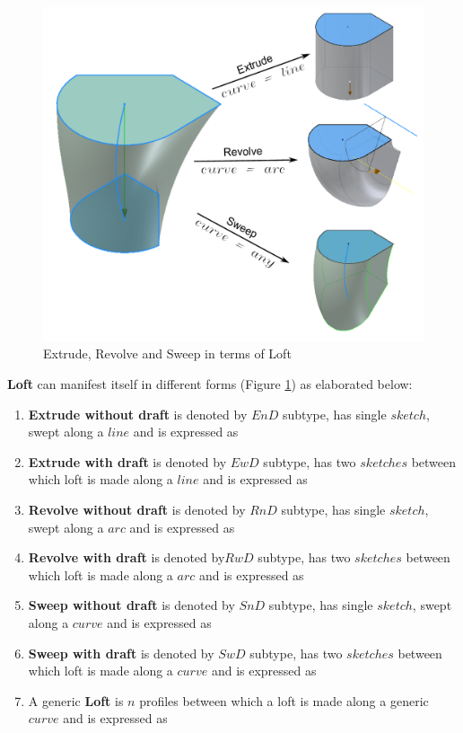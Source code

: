 \begin{figure}[htbp]
	\includegraphics[scale=0.35]{../Common/images//LoftExtrudeRevSwp.pdf} 
\caption{Extrude, Revolve and Sweep in terms of Loft}
\label{figure_extrevswp}
\end{figure}

{\bf Loft} can manifest itself in different forms (Figure \ref{figure_extrevswp}) as elaborated below:
\begin{enumerate}
\item {\bf Extrude without draft} is denoted by $EnD$ subtype, has single $sketch$, swept along a $line$ and is expressed as			
\item {\bf Extrude with draft} is denoted by $EwD$ subtype, has two $sketches$ between which loft is made along a $line$ and is expressed as 	
\item {\bf Revolve without draft} is denoted by $RnD$ subtype, has single $sketch$, swept along a $arc$ and is expressed as			
\item {\bf Revolve with draft} is denoted by$ RwD$ subtype, has two $sketches$ between which loft is made along a $arc$ and is expressed as	
\item {\bf Sweep without draft} is denoted by $SnD$ subtype, has single $sketch$, swept along a $curve$ and is expressed as			
\item {\bf Sweep with draft} is denoted by $SwD$ subtype, has two $sketches$ between which loft is made along a $curve$ and is expressed as 	
\item A generic {\bf Loft} is $n$ profiles between which a loft is made along a generic $curve$ and is expressed as  
\end{enumerate}


